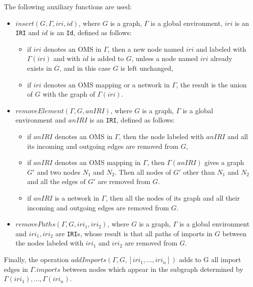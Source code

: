 \documentclass[10pt, a4paper]{isov2}
\newcommand*{\syntax}[1]{\texttt{#1}}
\begin{document}
 The following auxiliary functions are used: 

\begin{itemize}
\item $insert(G, \Gamma, iri,id)$, where $G$ is a graph, 
      $\Gamma$ is a global environment, $iri$ is an \syntax{IRI} and 
      $id$ is an \syntax{Id}, defined as follows:
 \begin{itemize}
    \item if $iri$ denotes an OMS in $\Gamma$, then
                 a new node named $iri$ and labeled with $\Gamma(iri)$ and with $id$ is added to $G$,
                 unless a node named $iri$ already exists in $G$, and in this case $G$ is left unchanged,
   \item if $iri$ denotes an OMS mapping 
      or a network in $\Gamma$, 
      the result is the union of $G$ with the graph of $\Gamma(iri)$.
 \end{itemize}

\item $removeElement(\Gamma, G, anIRI)$, where $G$ is a graph, 
      $\Gamma$ is a global environment and $anIRI$ is an \syntax{IRI},
      defined as follows: 

 \begin{itemize}
    \item if $anIRI$ denotes an OMS in $\Gamma$, 
          then the node labeled with $anIRI$ and all its incoming and outgoing
                edges are removed from $G$,
   \item  if $anIRI$ denotes an OMS mapping in $\Gamma$, then  
   $\Gamma(anIRI)$ gives a graph $G'$ and two nodes 
   $N_1$ and $N_2$. Then all nodes of $G'$ other than $N_1$ and
   $N_2$ and all the edges of $G'$ are removed from $G$.
   \item if $anIRI$ is a network in $\Gamma$, then all the nodes of its graph and all their incoming and outgoing edges are removed 
               from $G$.
 \end{itemize}
 
 \item $removePaths(\Gamma, G, iri_1, iri_2)$, where $G$ is a graph, 
      $\Gamma$ is a global environment and $iri_1, iri_2$ are \syntax{IRI}s,
 whose result is that
 all paths of imports in $G$ between the nodes labeled with 
 $iri_1$ and $iri_2$ are removed from $G$.

\end{itemize}

Finally, the operation $addImports(\Gamma, G, [iri_1, \ldots, iri_n])$ adds to G
all import edges in $\Gamma.imports$ between nodes which appear 
in the subgraph determined by  $\Gamma(iri_1), \ldots, \Gamma(iri_n)$. 
\end{document}
